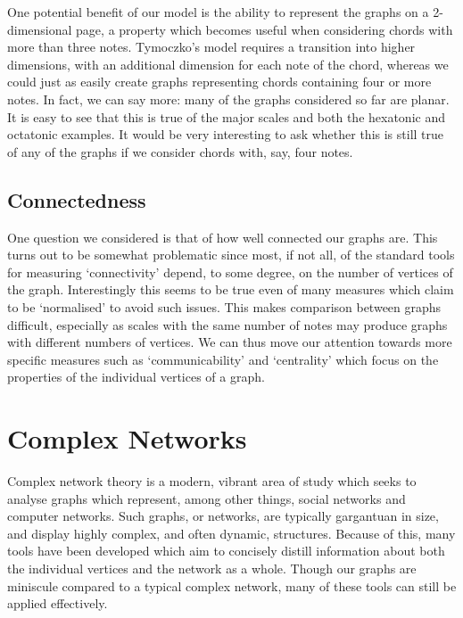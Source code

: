 \documentclass[]{tMAM2e}
\begin{document}
One potential benefit of our model is the ability to represent the graphs on a 2-dimensional page, a property which becomes useful when considering chords with more than three notes. Tymoczko's model requires a transition into higher dimensions, with an additional dimension for each note of the chord, whereas we could just as easily create graphs representing chords containing four or more notes. In fact, we can say more: many of the graphs considered so far are planar. It is easy to see that this is true of the major scales and both the hexatonic and octatonic examples. It would be very interesting to ask whether this is still true of any of the graphs if we consider chords with, say, four notes.

\subsection{Connectedness}

One question we considered is that of how well connected our graphs are. This turns out to be somewhat problematic since most, if not all, of the standard tools for measuring `connectivity' depend, to some degree, on the number of vertices of the graph. Interestingly this seems to be true even of many measures which claim to be ‘normalised’ to avoid such issues. This makes comparison between graphs difficult, especially as scales with the same number of notes may produce graphs with different numbers of vertices. We can thus move our attention towards more specific measures such as ‘communicability’ and ‘centrality’ which focus on the properties of the individual vertices of a graph.


\section{Complex Networks}

Complex network theory is a modern, vibrant area of study which seeks to analyse graphs which represent, among other things, social networks and computer networks. Such graphs, or networks, are typically gargantuan in size, and display highly complex, and often dynamic, structures. Because of this, many tools have been developed which aim to concisely distill information about both the individual vertices and the network as a whole. Though our graphs are miniscule compared to a typical complex network, many of these tools can still be applied effectively.
\end{document}
